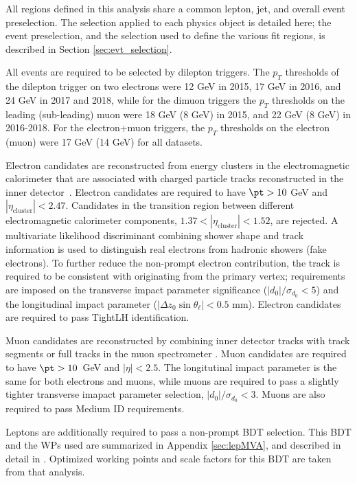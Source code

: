 
All regions defined in this analysis share a common lepton, jet, and overall event preselection. The selection applied to each physics object is detailed here; the event preselection, and the selection used to define the various fit regions, is described in Section \ref{sec:evt_selection}.

All events are required to be selected by dilepton triggers. The $p_T$ thresholds of the dilepton trigger on two electrons were 12 GeV in 2015, 17 GeV in 2016, and 24 GeV in 2017 and 2018, while for the dimuon triggers the $p_T$ thresholds on the leading (sub-leading) muon were 18 GeV (8 GeV) in 2015, and 22 GeV (8 GeV) in 2016-2018. For the electron+muon triggers, the $p_T$ thresholds on the electron (muon) were 17 GeV (14 GeV) for all datasets.

Electron candidates are reconstructed from energy clusters in the electromagnetic calorimeter that are associated with charged particle tracks reconstructed in the inner detector~\cite{ATLAS-CONF-2016-024}. Electron candidates are required to have $\pt > 10$ GeV and $|\eta_\textrm{cluster}| < 2.47$. Candidates in the transition region between different electromagnetic calorimeter components, $1.37 < |\eta_\textrm{cluster}| < 1.52$, are rejected. A multivariate likelihood discriminant combining shower shape and track information is used to distinguish real electrons from hadronic showers (fake electrons). To further reduce the non-prompt electron contribution, the track is required to be consistent with originating from the primary vertex; requirements are imposed on the transverse impact parameter significance ($|d_0|/\sigma_{d_0}<5$) and the longitudinal impact parameter ($|\Delta z_0 \sin \theta_\ell| < 0.5$ mm). Electron candidates are required to pass TightLH identification.
                   
Muon candidates are reconstructed by combining inner detector tracks with track segments or full tracks in the muon spectrometer \cite{PERF-2014-05}. Muon candidates are required to have $\pt > 10$~GeV and $|\eta| < 2.5$. The longitutinal impact parameter is the same for both electrons and muons, while muons are required to pass a slightly tighter transverse imapact parameter selection, $|d_0|/\sigma_{d_0}<3$. Muons are also required to pass Medium ID requirements. 

Leptons are additionally required to pass a non-prompt BDT selection. This BDT and the WPs used are summarized in Appendix \ref{sec:lepMVA}, and described in detail in \cite{ttW_140}. Optimized working points and scale factors for this BDT are taken from that analysis.

